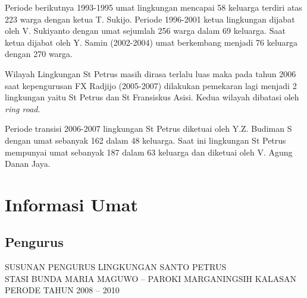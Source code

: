 \documentclass[a5paper,titlepage,11pt]{book}
\begin{document}
Periode berikutnya 1993-1995 umat lingkungan mencapai 58 keluarga terdiri atas 223 warga dengan ketua T. Sukijo. Periode 1996-2001 ketua lingkungan dijabat oleh V. Sukiyanto dengan umat sejumlah 256 warga dalam 69 keluarga. Saat ketua dijabat oleh Y. Samin (2002-2004) umat berkembang menjadi 76 keluarga dengan 270 warga.

Wilayah Lingkungan St Petrus masih dirasa terlalu luas maka pada tahun 2006 saat kepengurusan FX Radjijo (2005-2007) dilakukan pemekaran lagi menjadi 2 lingkungan yaitu St Petrus dan St Fransiskus Asisi. Kedua wilayah dibatasi oleh {\it ring road}. 

Periode transisi 2006-2007 lingkungan St Petrus diketuai oleh Y.Z. Budiman S dengan umat sebanyak 162 dalam 48 keluarga. Saat ini lingkungan St Petrus mempunyai umat sebanyak 187 dalam 63 keluarga dan diketuai oleh V. Agung Danan Jaya.
 
\chapter*{Informasi Umat}
\section{Pengurus}
\begin{center}
SUSUNAN PENGURUS LINGKUNGAN SANTO PETRUS\\
STASI BUNDA MARIA MAGUWO -- PAROKI MARGANINGSIH KALASAN\\
PERODE TAHUN 2008 -- 2010
\end{center}
\end{document}
